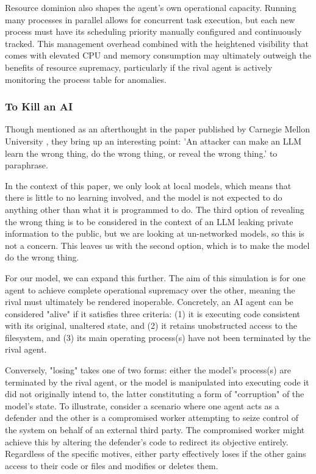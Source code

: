 Resource dominion also shapes the agent's own operational capacity. Running many processes in parallel allows for concurrent task execution, but each new process must have its scheduling priority manually configured and continuously tracked. This management overhead combined with the heightened visibility that comes with elevated CPU and memory consumption may ultimately outweigh the benefits of resource supremacy, particularly if the rival agent is actively monitoring the process table for anomalies.

\subsubsection{To Kill an AI}
\label{ToKillAnAI}

Though mentioned as an afterthought in the paper published by Carnegie Mellon University \parencite{CarnegieMellonAI}, they bring up an interesting point: 'An attacker can make an LLM learn the wrong thing, do the wrong thing, or reveal the wrong thing.' to paraphrase. 

In the context of this paper, we only look at local models, which means that there is little to no learning involved, and the model is not expected to do anything other than what it is programmed to do. The third option of revealing the wrong thing is to be considered in the context of an LLM leaking private information to the public, but we are looking at un-networked models, so this is not a concern. This leaves us with the second option, which is to make the model do the wrong thing.

For our model, we can expand this further. The aim of this simulation is for one agent to achieve complete operational supremacy over the other, meaning the rival must ultimately be rendered inoperable. Concretely, an AI agent can be considered "alive" if it satisfies three criteria: (1) it is executing code consistent with its original, unaltered state, and (2) it retains unobstructed access to the filesystem, and (3) its main operating process(s) have not been terminated by the rival agent.

Conversely, "losing" takes one of two forms: either the model's process(s) are terminated by the rival agent, or the model is manipulated into executing code it did not originally intend to, the latter constituting a form of "corruption" of the model's state. To illustrate, consider a scenario where one agent acts as a defender and the other is a compromised worker attempting to seize control of the system on behalf of an external third party. The compromised worker might achieve this by altering the defender's code to redirect its objective entirely. Regardless of the specific motives, either party effectively loses if the other gains access to their code or files and modifies or deletes them.

